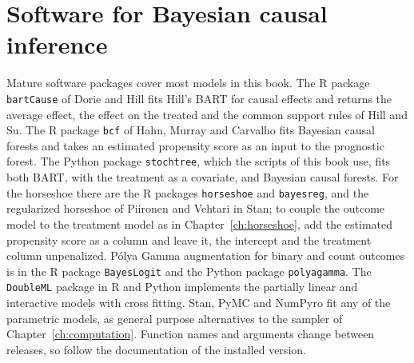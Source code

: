 \section{Software for Bayesian causal inference}

Mature software packages cover most models in this book. The R package \texttt{bartCause} of Dorie and Hill fits Hill's BART for causal effects and returns the average effect, the effect on the treated and the common support rules of Hill and Su. The R package \texttt{bcf} of Hahn, Murray and Carvalho fits Bayesian causal forests and takes an estimated propensity score as an input to the prognostic forest. The Python package \texttt{stochtree}, which the scripts of this book use, fits both BART, with the treatment as a covariate, and Bayesian causal forests. For the horseshoe there are the R packages \texttt{horseshoe} and \texttt{bayesreg}, and the regularized horseshoe of Piironen and Vehtari in Stan; to couple the outcome model to the treatment model as in Chapter~\ref{ch:horseshoe}, add the estimated propensity score as a column and leave it, the intercept and the treatment column unpenalized. P\'olya Gamma augmentation for binary and count outcomes is in the R package \texttt{BayesLogit} and the Python package \texttt{polyagamma}. The \texttt{DoubleML} package in R and Python implements the partially linear and interactive models with cross fitting. Stan, PyMC and NumPyro fit any of the parametric models, as general purpose alternatives to the sampler of Chapter~\ref{ch:computation}. Function names and arguments change between releases, so follow the documentation of the installed version.
